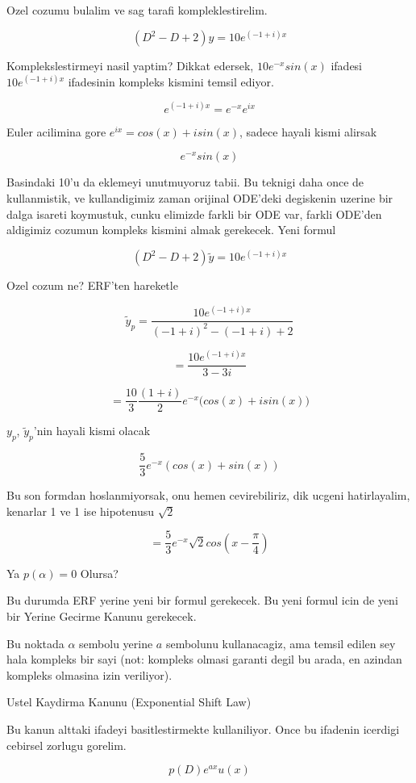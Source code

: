 \documentclass[12pt,fleqn]{article}
\begin{document}
Ozel cozumu bulalim ve sag tarafi kompleklestirelim. 

\[ (D^2 - D + 2)y = 10 e ^{(-1 + i)x} \]

Komplekslestirmeyi nasil yaptim? Dikkat edersek, $10e^{-x}sin(x)$ ifadesi
$10 e^{(-1 + i)x}$ ifadesinin kompleks kismini temsil ediyor. 

\[ e ^{(-1 + i)x} = e^{-x} e^{ix} \]

Euler acilimina gore $e^{ix} = cos(x) + isin(x)$, sadece hayali kismi alirsak

\[ e^{-x} sin(x)  \]

Basindaki 10'u da eklemeyi unutmuyoruz tabii. Bu teknigi daha once de
kullanmistik, ve kullandigimiz zaman orijinal ODE'deki degiskenin uzerine
bir dalga isareti koymustuk, cunku elimizde farkli bir ODE var, farkli
ODE'den aldigimiz cozumun kompleks kismini almak gerekecek. Yeni formul

\[ (D^2 - D + 2)\tilde{y} = 10 e ^{(-1 + i)x} \]

Ozel cozum ne? ERF'ten hareketle

\[ \tilde{y}_p = \frac{10 e^{(-1+i)x}}{(-1+i)^2 - (-1+i) + 2} \]

\[  = \frac{10 e^{(-1+i)x}}{3 - 3i} \]

\[ = \frac{10}{3}\frac{(1+i)}{2} e^{-x} \bigg( cos(x) + isin(x) \bigg)\]

$y_p$, $\tilde{y}_p$'nin hayali kismi olacak

\[ \frac{5}{3}e^{-x}( cos(x) + sin(x)) \]

Bu son formdan hoslanmiyorsak, onu hemen cevirebiliriz, dik ucgeni
hatirlayalim, kenarlar 1 ve 1 ise hipotenusu $\sqrt{2}$

\[ = \frac{5}{3}e^{-x} \sqrt{2}cos(x - \frac{\pi}{4})\]

Ya $p(\alpha) = 0$ Olursa?

Bu durumda ERF yerine yeni bir formul gerekecek. Bu yeni formul icin de
yeni bir Yerine Gecirme Kanunu gerekecek. 

Bu noktada $\alpha$ sembolu yerine $a$ sembolunu kullanacagiz, ama temsil
edilen sey hala kompleks bir sayi (not: kompleks olmasi garanti degil bu
arada, en azindan kompleks olmasina izin veriliyor). 

Ustel Kaydirma Kanunu (Exponential Shift Law)

Bu kanun alttaki ifadeyi basitlestirmekte kullaniliyor. Once bu ifadenin
icerdigi cebirsel zorlugu gorelim.

\[ p(D)e^{ax}u(x) \]
\end{document}
